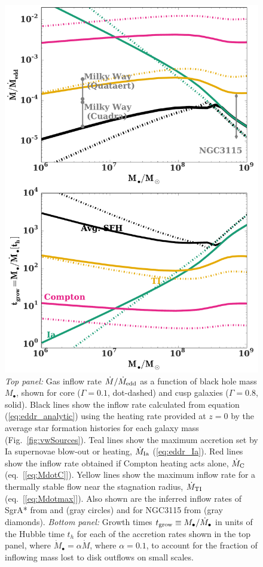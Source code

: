 \documentclass[usenatbib,fleqn]{mn2e}
\newcommand{\Mbh}[1][]{M_{\bullet#1}}
\renewcommand{\th}{t_h}
\begin{document}
\begin{figure}
\includegraphics[width=\columnwidth]{mdot_sfr.pdf}
\caption{\label{fig:bh_growth} {\it Top panel:} Gas inflow rate
  $\dot{M}/\dot{M}_{\rm edd}$ as a function of black hole mass
  $M_{\bullet}$, shown for core ($\Gamma=0.1$, dot-dashed) and cusp
  galaxies ($\Gamma=0.8$, solid).  Black lines show the inflow rate
  calculated from equation (\ref{eq:eddr_analytic}) using the heating
  rate provided at $z = 0$ by the average star formation histories for
  each galaxy mass (Fig.~\ref{fig:vwSources}).  Teal lines show the
  maximum accretion set by Ia supernovae blow-out or heating,
  $\dot{M}_{\rm Ia}$ (\ref{eq:eddr_Ia}).  Red lines show the inflow
  rate obtained if Compton heating acts alone, $\dot{M}_{\rm C}$
  (eq.~[\ref{eq:MdotC}]).  Yellow lines show the maximum inflow rate
  for a thermally stable flow near the stagnation radius,
  $\dot{M}_{\rm TI}$ (eq.~[\ref{eq:Mdotmax}]).  Also shown are the
  inferred inflow rates of SgrA* from \citet{Quataert:2004a} and
  \citet{Cuadra+2008} (gray circles) and for NGC3115 from
  \citet{ShcherbakovWong+:2014a} (gray diamonds).  {\it Bottom panel:}
  Growth times $t_{\rm grow} \equiv \Mbh/\dot{M}_{\bullet}$ in units
  of the Hubble time $\th$ for each of the accretion rates shown in
  the top panel, where $\dot{M}_{\bullet} = \alpha\dot{M}$, where
  $\alpha = 0.1$, to account for the fraction of inflowing mass lost
  to disk outflows on small scales.}
\end{figure}
\end{document}
